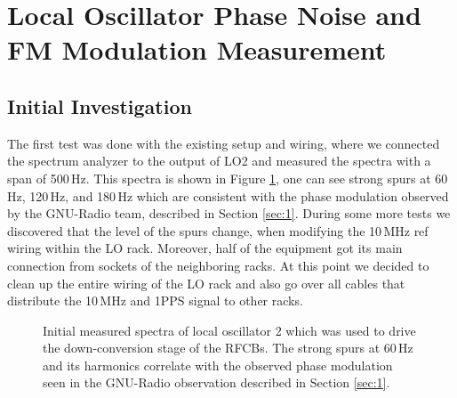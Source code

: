 \documentclass[12pt]{article}
\begin{document}
\newpage
\section[LO Phase Noise and Spur Measurement]{Local Oscillator Phase Noise and FM Modulation Measurement}
\label{sec:3}
\subsection{Initial Investigation}

The first test was done with the existing setup and wiring, where we connected the spectrum analyzer to the output of LO2 and measured the spectra with a span of 500\,Hz. This spectra is shown in Figure \ref{fig:LO2-HP-83731B-original}, one can see strong spurs at 60\,Hz, 120\,Hz, and 180\,Hz which are consistent with the phase modulation observed by the GNU-Radio team, described in Section \ref{sec:1}. During some more tests we discovered that the level of the spurs change, when modifying the 10\,MHz ref wiring within the LO rack. Moreover, half of the equipment got its main connection from sockets of the neighboring racks. At this point we decided to clean up the entire wiring of the LO rack and also go over all cables that distribute the 10\,MHz and 1PPS signal to other racks. 

%
\begin{figure}[H]
\caption{Initial measured spectra of local oscillator 2 which was used to drive the down-conversion stage of the RFCBs. The strong spurs at 60\,Hz and its harmonics correlate with the observed phase modulation seen in the GNU-Radio observation described in Section \ref{sec:1}. }
\label{fig:LO2-HP-83731B-original}
\end{figure}
%
\end{document}
